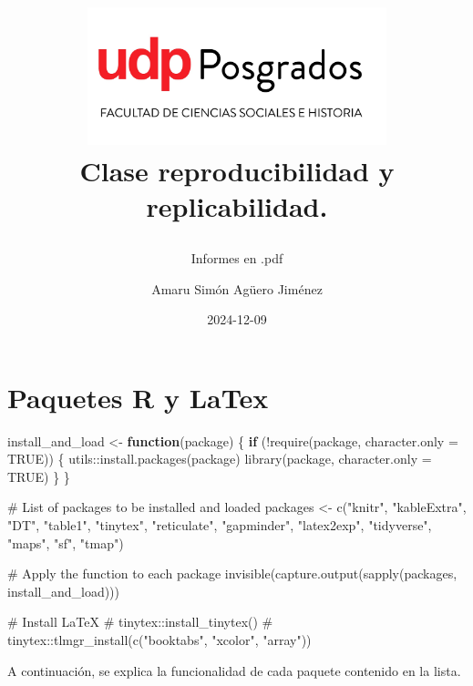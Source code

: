 \documentclass[
  10pt,
]{article}
\title{\begin{center}
  \includegraphics[height=4cm]{logo.png} \\[1cm]
  \Large Clase reproducibilidad y replicabilidad. \\
\end{center}}
\subtitle{Informes en .pdf}
\author{Amaru Simón Agüero Jiménez}
\date{2024-12-09}
\newenvironment{Shaded}{\begin{snugshade}}{\end{snugshade}}
\newcommand{\AttributeTok}[1]{\textcolor[rgb]{0.40,0.45,0.13}{#1}}
\newcommand{\CommentTok}[1]{\textcolor[rgb]{0.37,0.37,0.37}{#1}}
\newcommand{\ConstantTok}[1]{\textcolor[rgb]{0.56,0.35,0.01}{#1}}
\newcommand{\ControlFlowTok}[1]{\textcolor[rgb]{0.00,0.23,0.31}{\textbf{#1}}}
\newcommand{\FunctionTok}[1]{\textcolor[rgb]{0.28,0.35,0.67}{#1}}
\newcommand{\NormalTok}[1]{\textcolor[rgb]{0.00,0.23,0.31}{#1}}
\newcommand{\OtherTok}[1]{\textcolor[rgb]{0.00,0.23,0.31}{#1}}
\newcommand{\SpecialCharTok}[1]{\textcolor[rgb]{0.37,0.37,0.37}{#1}}
\newcommand{\StringTok}[1]{\textcolor[rgb]{0.13,0.47,0.30}{#1}}
\renewcommand*\contentsname{Tabla de contenidos}
\newcommand\contentsname{Tabla de contenidos}
\begin{document}
\maketitle

\renewcommand*\contentsname{Tabla de contenidos}
{
\hypersetup{linkcolor=}
\setcounter{tocdepth}{3}
\tableofcontents
}

\section{Paquetes R y LaTex}\label{paquetes-r-y-latex}

\begin{Shaded}
\begin{Highlighting}[]
\NormalTok{install\_and\_load }\OtherTok{\textless{}{-}} \ControlFlowTok{function}\NormalTok{(package) \{}
  \ControlFlowTok{if}\NormalTok{ (}\SpecialCharTok{!}\FunctionTok{require}\NormalTok{(package, }\AttributeTok{character.only =} \ConstantTok{TRUE}\NormalTok{)) \{}
\NormalTok{    utils}\SpecialCharTok{::}\FunctionTok{install.packages}\NormalTok{(package)}
    \FunctionTok{library}\NormalTok{(package, }\AttributeTok{character.only =} \ConstantTok{TRUE}\NormalTok{)}
\NormalTok{  \}}
\NormalTok{\}}

\CommentTok{\# List of packages to be installed and loaded}
\NormalTok{packages }\OtherTok{\textless{}{-}} \FunctionTok{c}\NormalTok{(}\StringTok{"knitr"}\NormalTok{,}
              \StringTok{"kableExtra"}\NormalTok{, }
              \StringTok{"DT"}\NormalTok{, }
              \StringTok{"table1"}\NormalTok{,}
              \StringTok{"tinytex"}\NormalTok{,}
              \StringTok{"reticulate"}\NormalTok{,}
              \StringTok{"gapminder"}\NormalTok{,}
              \StringTok{"latex2exp"}\NormalTok{,}
              \StringTok{"tidyverse"}\NormalTok{, }
              \StringTok{"maps"}\NormalTok{, }
              \StringTok{"sf"}\NormalTok{, }
              \StringTok{"tmap"}\NormalTok{)}

\CommentTok{\# Apply the function to each package}
\FunctionTok{invisible}\NormalTok{(}\FunctionTok{capture.output}\NormalTok{(}\FunctionTok{sapply}\NormalTok{(packages, install\_and\_load)))}

\CommentTok{\# Install LaTeX}
\CommentTok{\# tinytex::install\_tinytex()}
\CommentTok{\# tinytex::tlmgr\_install(c("booktabs", "xcolor", "array"))}
\end{Highlighting}
\end{Shaded}

A continuación, se explica la funcionalidad de cada paquete contenido en
la lista.
\end{document}
